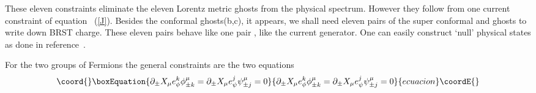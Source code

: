 \documentclass[a4paper,showpacs,preprintnumbers,amsmath,amssymb]{revtex4}
\begin{document}
These eleven constraints eliminate the eleven Lorentz metric ghosts 
from the physical spectrum. However they follow from one current constraint of equation
~(\ref{J}). Besides the conformal ghosts(b,c), it appears, we shall need eleven pairs of the
super conformal \coordHE{}  and \coordHE{} ghosts to write down
BRST charge. These eleven pairs behave like one pair \myHighlight{$(\beta, \gamma)$}\coordHE{}, like the current 
generator. One can easily construct `null' physical states as done in reference~\cite{gr}. 

For the two groups of Fermions the general constraints 
are the two equations
\begin{equation}\coord{}\boxEquation{
\partial_{\pm}X_{\mu}e^k_{\phi}\phi^{\mu}_{\pm k} = \partial_{\pm}X_{\mu}
e^j_{\psi}\psi^{\mu}_{\pm j}=0\label{5}
}{
\partial_{\pm}X_{\mu}e^k_{\phi}\phi^{\mu}_{\pm k} = \partial_{\pm}X_{\mu}
e^j_{\psi}\psi^{\mu}_{\pm j}=0}{ecuacion}\coordE{}\end{equation}
\end{document}

